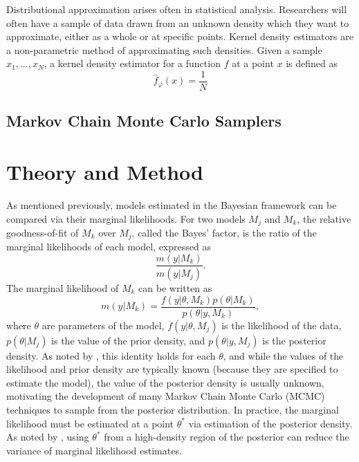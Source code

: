 \documentclass[twocolumn]{article}
\begin{document}
Distributional approximation arises often in statistical analysis. Researchers will often have a sample of data drawn from an unknown density which they want to approximate, either as a whole or at specific points. Kernel density estimators are a non-parametric method of approximating such densities. Given a sample $x_1, ..., x_N$, a kernel density estimator for a function $f$ at a point $x$ is defined as
\begin{equation}
	\hat{f}_\varphi(x) = \frac{1}{N}
\end{equation}

\subsection{Markov Chain Monte Carlo Samplers}

\section{Theory and Method}

As mentioned previously, models estimated in the Bayesian framework can be compared via their marginal likelihoods. For two models $M_j$ and $M_k$, the relative goodness-of-fit of $M_k$ over $M_j$, called the Bayes' factor, is the ratio of the marginal likelihoods of each model, expressed as
\begin{equation}
	\frac{m(y|M_k)}{m(y|M_j)}.
\end{equation}
The marginal likelihood of $M_k$ can be written as
\begin{equation}
	m(y|M_k) = \frac{f(y|\theta, M_k)p(\theta|M_k)}{p(\theta|y, M_k)},
\end{equation}
where $\theta$ are parameters of the model, $f(y|\theta, M_j)$ is the likelihood of the data, $p(\theta|M_j)$ is the value of the prior density, and $p(\theta|y, M_j)$ is the posterior density. As noted by \cite{Chib}, this identity holds for each $\theta$, and while the values of the likelihood and prior density are typically known (because they are specified to estimate the model), the value of the posterior density is usually unknown, motivating the development of many Markov Chain Monte Carlo (MCMC) techniques to sample from the posterior distribution. In practice, the marginal likelihood must be estimated at a point $\theta^*$ via estimation of the posterior density. As noted by \cite{Chib}, using $\theta^*$ from a high-density region of the posterior can reduce the variance of marginal likelihood estimates.
\end{document}
